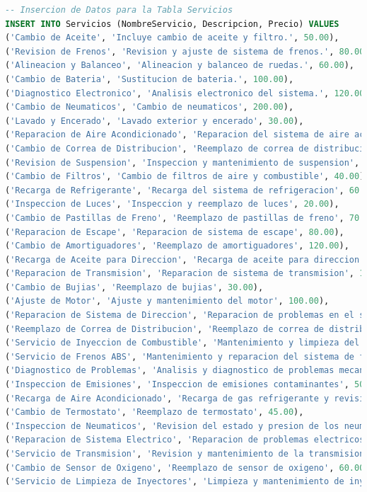\documentclass[12pt]{article}
\begin{document}
\begin{lstlisting}[language=SQL]
-- Insercion de Datos para la Tabla Servicios
INSERT INTO Servicios (NombreServicio, Descripcion, Precio) VALUES
('Cambio de Aceite', 'Incluye cambio de aceite y filtro.', 50.00),
('Revision de Frenos', 'Revision y ajuste de sistema de frenos.', 80.00),
('Alineacion y Balanceo', 'Alineacion y balanceo de ruedas.', 60.00),
('Cambio de Bateria', 'Sustitucion de bateria.', 100.00),
('Diagnostico Electronico', 'Analisis electronico del sistema.', 120.00),
('Cambio de Neumaticos', 'Cambio de neumaticos', 200.00),
('Lavado y Encerado', 'Lavado exterior y encerado', 30.00),
('Reparacion de Aire Acondicionado', 'Reparacion del sistema de aire acondicionado', 150.00),
('Cambio de Correa de Distribucion', 'Reemplazo de correa de distribucion', 90.00),
('Revision de Suspension', 'Inspeccion y mantenimiento de suspension', 75.00),
('Cambio de Filtros', 'Cambio de filtros de aire y combustible', 40.00),
('Recarga de Refrigerante', 'Recarga del sistema de refrigeracion', 60.00),
('Inspeccion de Luces', 'Inspeccion y reemplazo de luces', 20.00),
('Cambio de Pastillas de Freno', 'Reemplazo de pastillas de freno', 70.00),
('Reparacion de Escape', 'Reparacion de sistema de escape', 80.00),
('Cambio de Amortiguadores', 'Reemplazo de amortiguadores', 120.00),
('Recarga de Aceite para Direccion', 'Recarga de aceite para direccion', 25.00),
('Reparacion de Transmision', 'Reparacion de sistema de transmision', 180.00),
('Cambio de Bujias', 'Reemplazo de bujias', 30.00),
('Ajuste de Motor', 'Ajuste y mantenimiento del motor', 100.00),
('Reparacion de Sistema de Direccion', 'Reparacion de problemas en el sistema de direccion', 99.99),
('Reemplazo de Correa de Distribucion', 'Reemplazo de correa de distribucion y ajuste', 129.99),
('Servicio de Inyeccion de Combustible', 'Mantenimiento y limpieza del sistema de inyeccion', 69.99),
('Servicio de Frenos ABS', 'Mantenimiento y reparacion del sistema de frenos ABS', 109.99),
('Diagnostico de Problemas', 'Analisis y diagnostico de problemas mecanicos', 49.99),
('Inspeccion de Emisiones', 'Inspeccion de emisiones contaminantes', 50.00),
('Recarga de Aire Acondicionado', 'Recarga de gas refrigerante y revision del sistema de aire acondicionado', 69.99),
('Cambio de Termostato', 'Reemplazo de termostato', 45.00),
('Inspeccion de Neumaticos', 'Revision del estado y presion de los neumaticos', 30.00),
('Reparacion de Sistema Electrico', 'Reparacion de problemas electricos', 120.00),
('Servicio de Transmision', 'Revision y mantenimiento de la transmision', 159.99),
('Cambio de Sensor de Oxigeno', 'Reemplazo de sensor de oxigeno', 60.00),
('Servicio de Limpieza de Inyectores', 'Limpieza y mantenimiento de inyectores', 80.00);


\end{lstlisting}
\end{document}
